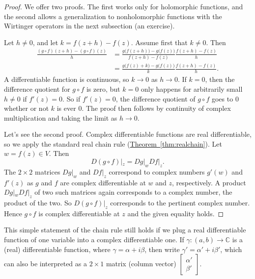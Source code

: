 \documentclass[12pt,openany]{book}
\newcommand{\C}{{\mathbb{C}}}
\theoremstyle{plain}
\theoremstyle{remark}
\theoremstyle{definition}
\theoremstyle{exercise}
\theoremstyle{example}
\newcommand{\thmref}[1]{\hyperref[#1]{Theorem~\ref*{#1}}}
\begin{document}
\begin{proof}
We offer two proofs.  The first works only for holomorphic
functions, and the second allows a generalization to nonholomorphic functions
with the Wirtinger operators in the next subsection (an exercise).

Let $h \neq 0$, and let $k = f(z+h) -f(z)$.
Assume first that $k \neq 0$.
Then
\begin{equation*}
\begin{split}
\frac{(g \circ f)(z+h) - (g \circ f)(z)}{h}
& =
\frac{g \bigl( f(z+h) \bigr) - g\bigl( f(z) \bigr)}{f(z+h)-f(z)}
\frac{f(z+h)-f(z)}{h}
\\
& =
\frac{g \bigl( f(z) + k \bigr) - g\bigl( f(z) \bigr)}{k}
\frac{f(z+h)-f(z)}{h} .
\end{split}
\end{equation*}
A differentiable function is continuous, so $k \to 0$ as $h \to 0$.
If $k=0$, then the difference quotient for $g \circ f$ is zero, but $k=0$
only happens for arbitrarily small $h \neq 0$ if
$f'(z)=0$.  So if $f'(z)=0$,
the difference 
quotient of $g \circ f$ goes to $0$ whether or
not $k$ is ever $0$.
The proof then follows by continuity of complex multiplication and taking
the limit as $h \to 0$.

Let's see the second proof.
Complex differentiable functions are real differentiable, so
we apply the standard real chain rule (\thmref{thm:realchain}).
Let $w = f(z) \in V$.  Then
\begin{equation*}
D(g \circ f)|_z = Dg|_w Df|_z .
\end{equation*}
The $2 \times 2$ matrices $Dg|_w$ and $Df|_z$ correspond to complex
numbers $g'(w)$ and $f'(z)$ as $g$ and $f$ are complex differentiable at $w$
and $z$,
respectively.
A product $Dg|_w Df|_z$
of two such matrices again corresponds to a complex number, the product of
the two.
So $D(g \circ f)|_z$ corresponds to the pertinent complex number.
Hence $g \circ f$ is complex differentiable at $z$ and the given equality holds.
\end{proof}

This simple statement of the chain rule still holds
if we plug a real differentiable function of one variable
into a complex differentiable
one.  If $\gamma \colon (a,b)
\to \C$ is a (real) differentiable function, where
$\gamma = \alpha + i \beta$,
then write $\gamma' = \alpha' + i \beta'$, which can also be interpreted
as a $2 \times 1$ matrix (column vector)
$\left[\begin{smallmatrix}\alpha'\\\beta'\end{smallmatrix}\right]$.
\end{document}
